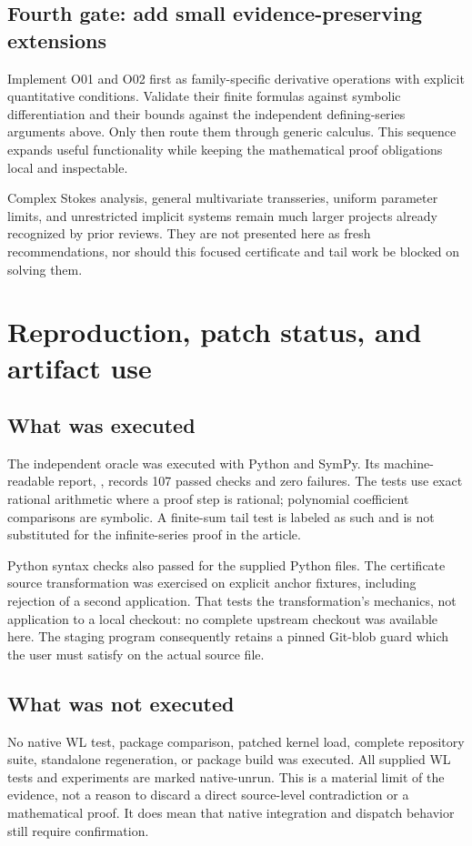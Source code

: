 \documentclass[11pt,a4paper]{article}
\begin{document}
\subsection{Fourth gate: add small evidence-preserving extensions}
Implement O01 and O02 first as family-specific derivative operations with explicit quantitative conditions. Validate their finite formulas against symbolic differentiation and their bounds against the independent defining-series arguments above. Only then route them through generic calculus. This sequence expands useful functionality while keeping the mathematical proof obligations local and inspectable.

Complex Stokes analysis, general multivariate transseries, uniform parameter limits, and unrestricted implicit systems remain much larger projects already recognized by prior reviews. They are not presented here as fresh recommendations, nor should this focused certificate and tail work be blocked on solving them.\cite{status}

\section{Reproduction, patch status, and artifact use}

\subsection{What was executed}
The independent oracle was executed with Python and SymPy. Its machine-readable report, , records 107 passed checks and zero failures. The tests use exact rational arithmetic where a proof step is rational; polynomial coefficient comparisons are symbolic. A finite-sum tail test is labeled as such and is not substituted for the infinite-series proof in the article.

Python syntax checks also passed for the supplied Python files. The certificate source transformation was exercised on explicit anchor fixtures, including rejection of a second application. That tests the transformation's mechanics, not application to a local checkout: no complete upstream checkout was available here. The staging program consequently retains a pinned Git-blob guard which the user must satisfy on the actual source file.

\subsection{What was not executed}
No native WL test, package comparison, patched kernel load, complete repository suite, standalone regeneration, or package build was executed. All supplied WL tests and experiments are marked native-unrun. This is a material limit of the evidence, not a reason to discard a direct source-level contradiction or a mathematical proof. It does mean that native integration and dispatch behavior still require confirmation.
\end{document}
